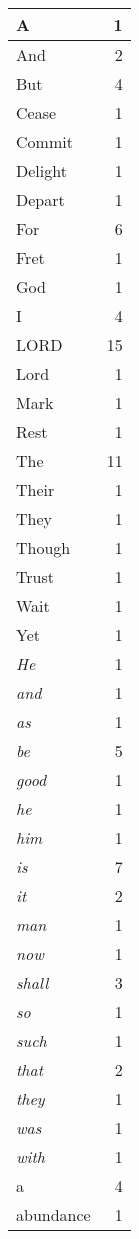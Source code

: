 \begin{center}
\begin{longtable}{l|r}
\hline \hline
\endlastfoot
A & 1 \\ \hline
And & 2 \\ \hline
But & 4 \\ \hline
Cease & 1 \\ \hline
Commit & 1 \\ \hline
Delight & 1 \\ \hline
Depart & 1 \\ \hline
For & 6 \\ \hline
Fret & 1 \\ \hline
God & 1 \\ \hline
I & 4 \\ \hline
LORD & 15 \\ \hline
Lord & 1 \\ \hline
Mark & 1 \\ \hline
Rest & 1 \\ \hline
The & 11 \\ \hline
Their & 1 \\ \hline
They & 1 \\ \hline
Though & 1 \\ \hline
Trust & 1 \\ \hline
Wait & 1 \\ \hline
Yet & 1 \\ \hline
\emph{He} & 1 \\ \hline
\emph{and} & 1 \\ \hline
\emph{as} & 1 \\ \hline
\emph{be} & 5 \\ \hline
\emph{good} & 1 \\ \hline
\emph{he} & 1 \\ \hline
\emph{him} & 1 \\ \hline
\emph{is} & 7 \\ \hline
\emph{it} & 2 \\ \hline
\emph{man} & 1 \\ \hline
\emph{now} & 1 \\ \hline
\emph{shall} & 3 \\ \hline
\emph{so} & 1 \\ \hline
\emph{such} & 1 \\ \hline
\emph{that} & 2 \\ \hline
\emph{they} & 1 \\ \hline
\emph{was} & 1 \\ \hline
\emph{with} & 1 \\ \hline
a & 4 \\ \hline
abundance & 1 \\ \hline

\end{longtable}
\end{center}
